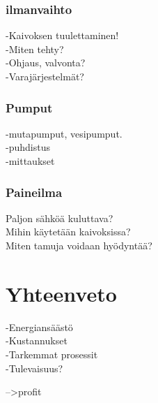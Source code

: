 \documentclass[finnish,12pt,a4paper,pdftex,elec,utf8]{aaltothesis}
\begin{document}



\subsubsection{ilmanvaihto}
-Kaivoksen tuulettaminen!\\
-Miten tehty?\\
-Ohjaus, valvonta?\\
-Varajärjestelmät?

\subsubsection{Pumput}
-mutapumput, vesipumput.\\
-puhdistus\\
-mittaukset

\subsubsection{Paineilma}
Paljon sähköä kuluttava?\\
Mihin käytetään kaivoksissa?\\
Miten tamuja voidaan hyödyntää?

\clearpage

\section{Yhteenveto}
-Energiansäästö\\
-Kustannukset\\
-Tarkemmat prosessit\\
-Tulevaisuus?

-->profit


\clearpage
\end{document}
